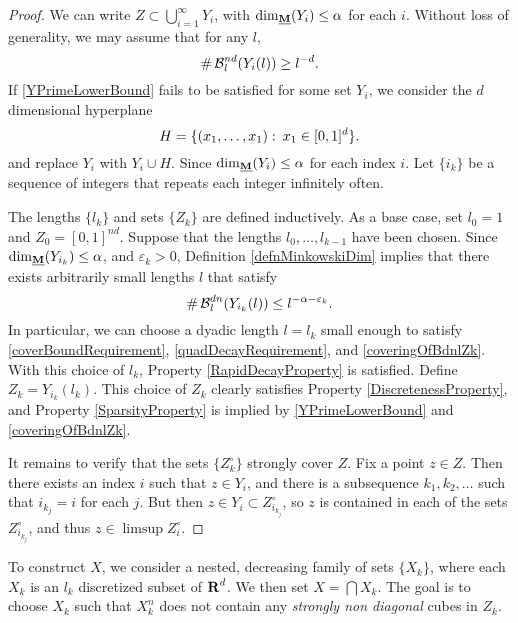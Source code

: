 \begin{proof}
	We can write $Z \subset \bigcup_{i = 1}^\infty Y_i$, with $\operatorname{\dim_{\underline{\mathbf{M}}}}(Y_i) \leq \alpha$ for each $i$. Without loss of generality, we may assume that for any $l$,
	\begin{equation}\label{YPrimeLowerBound}
		\# \operatorname{\mathcal{B}}^{nd}_l(Y_i(l)) \geq l^{-d}.
	\end{equation}
	If \eqref{YPrimeLowerBound} fails to be satisfied for some set $Y_i$, we consider the $d$ dimensional hyperplane
	\[ H = \{ (x_1,\dots, x_1) \operatorname{\colon} x_1 \in [0,1]^d \}. \]
	and replace $Y_i$ with $Y_i \cup H$. Since $\operatorname{\dim_{\underline{\mathbf{M}}}}(Y_i) \leq \alpha$ for each index $i$. Let $\{ i_k \}$ be a sequence of integers that repeats each integer infinitely often.

	The lengths $\{ l_k \}$ and sets $\{ Z_k \}$ are defined inductively. As a base case, set $l_0 = 1$ and $Z_0 = [0,1]^{nd}$. Suppose that the lengths $l_0, \ldots, l_{k-1}$ have been chosen. Since $\operatorname{\dim_{\underline{\mathbf{M}}}}(Y_{i_k}) \leq \alpha$, and $\varepsilon_k > 0$, Definition \ref{defnMinkowskiDim} implies that there exists arbitrarily small lengths $l$ that satisfy
	\begin{equation} \label{coveringOfBdnlZk}
		\# \operatorname{\mathcal{B}}^{dn}_l(Y_{i_k}(l)) \leq l^{-\alpha - \varepsilon_k}.
	\end{equation}
	In particular, we can choose a dyadic length $l = l_k$ small enough to satisfy \eqref{coverBoundRequirement}, \eqref{quadDecayRequirement}, and \eqref{coveringOfBdnlZk}. With this choice of $l_k$, Property \ref{RapidDecayProperty} is satisfied. Define $Z_k = Y_{i_k}(l_k)$. This choice of $Z_k$ clearly satisfies Property \ref{DiscretenessProperty}, and Property \ref{SparsityProperty} is implied by \eqref{YPrimeLowerBound} and \eqref{coveringOfBdnlZk}.

	It remains to verify that the sets $\{ Z_k^\circ \}$ strongly cover $Z$. Fix a point $z \in Z$. Then there exists an index $i$ such that $z \in Y_i$, and there is a subsequence $k_1, k_2, \dots$ such that $i_{k_j} = i$ for each $j$. But then $z \in Y_i \subset Z_{i_{k_j}}^\circ$, so $z$ is contained in each of the sets $Z_{i_{k_j}}^\circ$, and thus $z \in \limsup Z_i^\circ$.
\end{proof}

To construct $X$, we consider a nested, decreasing family of sets $\{ X_k \}$, where each $X_k$ is an $l_k$ discretized subset of $\operatorname{\mathbf{R}}^d$. We then set $X = \bigcap X_k$. The goal is to choose $X_k$ such that $X_k^n$ does not contain any {\it strongly non diagonal} cubes in $Z_k$.


